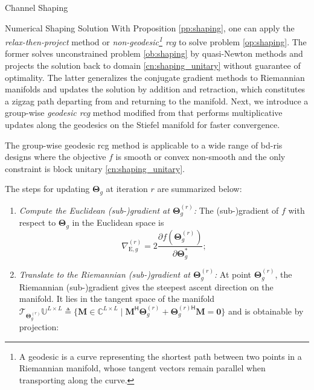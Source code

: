 \documentclass[journal]{IEEEtran}
\begin{document}
\begin{section}{Channel Shaping}
\begin{subsection}{Numerical Shaping Solution}
		With Proposition \ref{pp:shaping}, one can apply the \emph{relax-then-project} method \cite{Shen2020a,Fang2023} or \emph{non-geodesic\footnote{A geodesic is a curve representing the shortest path between two points in a Riemannian manifold, whose tangent vectors remain parallel when transporting along the curve.} \gls{rcg}} \cite{Li2023b,Li2023c,Zhou2023} to solve problem \eqref{op:shaping}.
		The former solves unconstrained problem \eqref{ob:shaping} by quasi-Newton methods and projects the solution back to domain \eqref{cn:shaping_unitary} without guarantee of optimality.
		The latter generalizes the conjugate gradient methods to Riemannian manifolds and updates the solution by addition and retraction, which constitutes a zigzag path departing from and returning to the manifold.
		Next, we introduce a group-wise \emph{geodesic \gls{rcg}} method modified from \cite{Abrudan2008,Abrudan2009} that performs multiplicative updates along the geodesics on the Stiefel manifold for faster convergence.
		\begin{remark}
			The group-wise geodesic \gls{rcg} method is applicable to a wide range of \gls{bd}-\gls{ris} designs where the objective $f$ is smooth or convex non-smooth and the only constraint is block unitary \eqref{cn:shaping_unitary}.
		\end{remark}
		The steps for updating $\mathbf{\Theta}_g$ at iteration $r$ are summarized below:
		\begin{enumerate}[label=(\roman*)]
			\item \emph{Compute the Euclidean (sub-)gradient at $\mathbf{\Theta}_g^{(r)}$:} The (sub-)gradient of $f$ with respect to $\mathbf{\Theta}_g$ in the Euclidean space is
				\begin{equation}
					\label{eq:gradient_eucl}
					\nabla_{\mathrm{E},g}^{(r)} = 2 \frac{\partial f(\mathbf{\Theta}_g^{(r)})}{\partial \mathbf{\Theta}_g^*};
				\end{equation}
			\item \emph{Translate to the Riemannian (sub-)gradient at $\mathbf{\Theta}_g^{(r)}$:} At point $\mathbf{\Theta}_g^{(r)}$, the Riemannian (sub-)gradient gives the steepest ascent direction on the manifold. It lies in the tangent space of the manifold $\mathcal{T}_{\mathbf{\Theta}_g^{(r)}}\mathbb{U}^{L \times L} \triangleq \{\mathbf{M} \in \mathbb{C}^{L \times L} \mid \mathbf{M}^\mathsf{H} \mathbf{\Theta}_g^{(r)} + {\mathbf{\Theta}_g^{(r)\mathsf{H}}} \mathbf{M} = \mathbf{0}\}$ and is obtainable by projection:
				\begin{equation}

\end{equation}
\end{enumerate}
\end{subsection}
\end{section}
\end{document}
